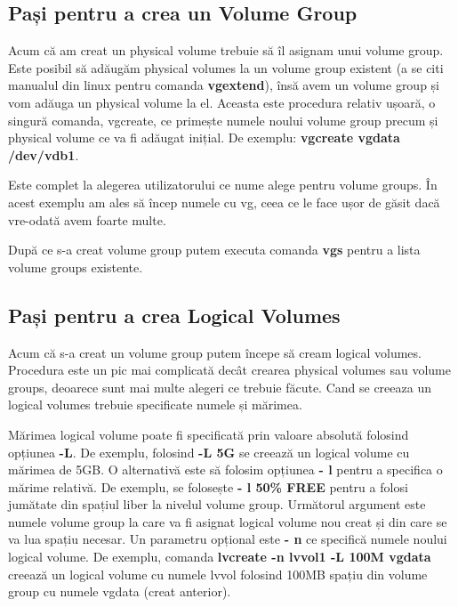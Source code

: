 \subsection{Pași pentru a crea un Volume Group}
Acum că am creat un physical volume trebuie să îl asignam unui volume group. Este posibil să adăugăm physical volumes la un volume group existent (a se citi manualul din linux pentru comanda \textbf{vgextend}), însă avem un volume group și vom adăuga un physical volume la el. Aceasta este procedura relativ ușoară, o singură comanda, vgcreate, ce primește numele noului volume group precum și physical volume ce va fi adăugat inițial. De exemplu: \textbf{vgcreate vgdata /dev/vdb1}.
\par Este complet la alegerea utilizatorului ce nume alege pentru volume groups. În acest exemplu am ales să încep numele cu vg, ceea ce le face ușor de găsit dacă vre-odată avem foarte multe. 
\par După ce s-a creat volume group putem executa comanda \textbf{vgs} pentru a lista volume groups existente.
\subsection{Pași pentru a crea Logical Volumes}
Acum că s-a creat un volume group putem începe să cream logical volumes. Procedura este un pic mai complicată decât crearea physical volumes sau volume groups, deoarece sunt mai multe alegeri ce trebuie făcute. Cand se creeaza un logical volumes trebuie specificate numele și mărimea.
\par
Mărimea logical volume poate fi specificată prin valoare absolută folosind opțiunea \textbf{-L}. De exemplu, folosind \textbf{-L 5G} se creează un logical volume cu mărimea de 5GB. O alternativă este să folosim opțiunea \textbf{- l} pentru a specifica o mărime relativă. De exemplu, se folosește \textbf{- l 50\% FREE} pentru a folosi jumătate din spațiul liber la nivelul volume group. Următorul argument este numele volume group la care va fi asignat logical volume nou creat și din care se va lua spațiu necesar. Un parametru opțional este \textbf{- n} ce specifică numele noului logical volume. De exemplu, comanda \textbf{lvcreate -n lvvol1 -L 100M vgdata} creează un logical volume cu numele lvvol folosind 100MB spațiu din volume group cu numele vgdata (creat anterior).
